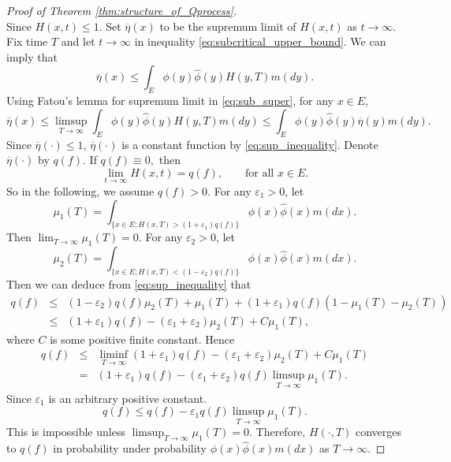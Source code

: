 \documentclass[12pt,a4paper]{amsart}
\numberwithin{equation}{section}
\theoremstyle{plain}
\theoremstyle{definition}
\begin{document}
{\begin{proof}[Proof of Theorem \ref{thm:structure_of_Qprocess}]
\[  \]
  Since $H(x,t)\leq 1$.  Set $\overline \eta(x)$ to be the supremum limit of $H(x,t)$ as $t\to \infty$.
  Fix time $T$ and let $t\to \infty$ in inequality \eqref{eq:subcritical_upper_bound}. We can imply that
  \begin{equation}\label{eq:sub_super}
    \overline\eta(x)\leq \int_E\phi(y)\widehat \phi(y)H(y,T)m(dy).
  \end{equation}
  Using Fatou's lemma for supremum limit
  in \eqref{eq:sub_super}, for any $x\in E$,
  \begin{equation}\label{eq:sup_inequality}
    \overline\eta(x)\leq \limsup_{T\rightarrow\infty}\int_E\phi(y)\widehat \phi(y)H(y,T)m(dy)\leq \int_E\phi(y)\widehat\phi(y)\overline{\eta}(y)m(dy).
  \end{equation}
  Since $\overline{\eta}(\cdot)\leq 1$, $\overline\eta(\cdot)$ is a constant function by \eqref{eq:sup_inequality}.
  Denote $\overline\eta(\cdot)$ by $q(f)$.  If $q(f)\equiv 0,$ then
  \begin{equation}\label{eq:limit}
    \lim_{t\rightarrow\infty}H(x,t)=q(f),\qquad \mbox{for all}\,\, x\in E.
  \end{equation}
  So in the
  following, we assume $q(f)>0$.
  For any $\varepsilon_1>0$, let
  $$
  \mu_1(T)=\int_{\{x\in
    E;H(x,T)>(1+\varepsilon_1)q(f)\}}\phi(x)\widehat\phi(x)m(dx).
  $$
  Then $\lim_{T\rightarrow\infty}\mu_1(T)=0.$  For any $\varepsilon_2>0$, let
  $$
  \mu_2(T)=\int_{\{x\in
    E;H(x,T)<(1-\varepsilon_2)q(f)\}}\phi(x)\widehat\phi(x)m(dx).
  $$
  Then we can deduce from \eqref{eq:sup_inequality} that
  \begin{eqnarray}\label{eq:sub_limit_in_prob}
    q(f)&\leq&
               (1-\varepsilon_2)q(f)\mu_2(T)+\mu_1(T)+(1+\varepsilon_1)q(f)(1-\mu_1(T)-\mu_2(T))\\
        &\le
             &(1+\varepsilon_1)q(f)-(\varepsilon_1+\varepsilon_2)\mu_2(T)+C\mu_1(T),
  \end{eqnarray}
  where $C$ is some positive finite constant.  Hence
  \begin{eqnarray*}\label{eq:sublimt_inequality}
    q(f)&\leq&
               \liminf_{T\rightarrow\infty}(1+\varepsilon_1)q(f)-(\varepsilon_1+\varepsilon_2)\mu_2(T)+C\mu_1(T)\\
        &=&(1+\varepsilon_1)q(f)-(\varepsilon_1+\varepsilon_2)q(f)\limsup_{T\rightarrow\infty}\mu_1(T).
  \end{eqnarray*}
  Since $\varepsilon_1$ is an arbitrary positive constant.
  \[
    q(f)\leq q(f)-\varepsilon_1 q(f)\limsup_{T\rightarrow\infty}\mu_1(T).
  \]
  This is impossible unless $\limsup_{T\rightarrow\infty}\mu_1(T)=0.$
  Therefore, $H(\cdot,T)$ converges to $q(f)$ in probability under probability $\phi(x)\widehat{\phi}(x)m(dx)$ as $T\to\infty$.



\end{proof}}
\end{document}

